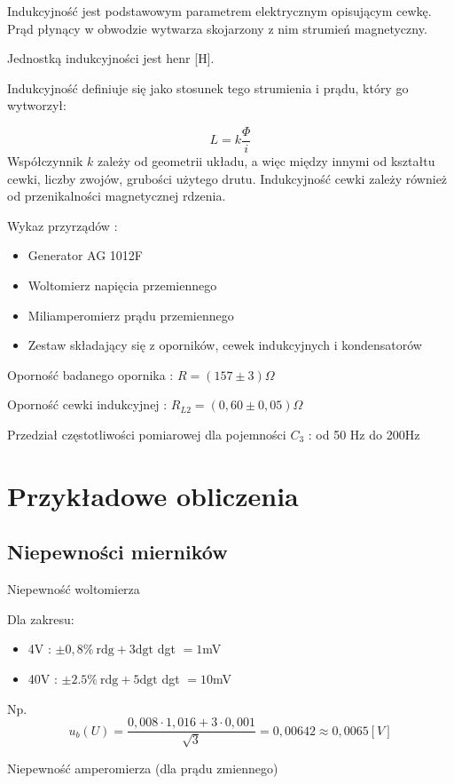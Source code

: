 \documentclass[12pt]{article}
\begin{document}
Indukcyjność jest podstawowym parametrem elektrycznym opisującym cewkę.
Prąd płynący w obwodzie wytwarza skojarzony z nim strumień magnetyczny.

Jednostką indukcyjności jest henr [H].


Indukcyjność definiuje się jako stosunek tego strumienia i prądu, który go wytworzył:

$$ L = k \frac{\Phi}{i} $$
Współczynnik $k$ zależy od geometrii układu, a więc między innymi od kształtu cewki, liczby zwojów, grubości użytego drutu. Indukcyjność cewki zależy również od przenikalności magnetycznej rdzenia.

\bigskip
Wykaz przyrządów :
\begin{itemize}
    \item Generator AG 1012F
    \item Woltomierz napięcia przemiennego
    \item Miliamperomierz prądu przemiennego
    \item Zestaw składający się z oporników, cewek indukcyjnych i kondensatorów
\end{itemize}

Oporność badanego opornika : $ R = (157 \pm 3) \Omega $

Oporność cewki indukcyjnej : $ R_{L2} = (0,60 \pm 0,05) \Omega $

Przedział częstotliwości pomiarowej dla pojemności $C_3$ : od 50 Hz do 200Hz

\section{Przykładowe obliczenia}
\subsection{Niepewności mierników}

Niepewność woltomierza

Dla zakresu:
\begin{itemize}
    \item 4V : $ \pm 0,8 \% \ \textrm{rdg} + 3\textrm{dgt}$ \quad dgt $=1$mV
    \item 40V : $ \pm 2.5 \% \ \textrm{rdg} + 5\textrm{dgt} $ \quad dgt $=10$mV
\end{itemize} \bigskip

Np.
$$ u_b(U) = \frac{0,008 \cdot 1,016 + 3 \cdot 0,001}{\sqrt{3}} = 0,00642 \approx 0,0065[V] $$ \bigskip

Niepewność amperomierza (dla prądu zmiennego)
\end{document}

